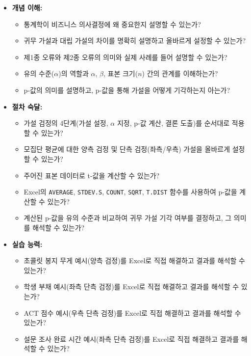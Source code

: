 \documentclass[11pt,a4paper]{article}
\theoremstyle{definition}
\begin{document}
\begin{itemize}
    \item \textbf{개념 이해:}
    \begin{itemize}
        \item 통계학이 비즈니스 의사결정에 왜 중요한지 설명할 수 있는가?
        \item 귀무 가설과 대립 가설의 차이를 명확히 설명하고 올바르게 설정할 수 있는가?
        \item 제1종 오류와 제2종 오류의 의미와 실제 사례를 들어 설명할 수 있는가?
        \item 유의 수준($\alpha$)의 역할과 $\alpha$, $\beta$, 표본 크기($n$) 간의 관계를 이해하는가?
        \item p-값의 의미를 설명하고, p-값을 통해 가설을 어떻게 기각하는지 아는가?
    \end{itemize}
    \item \textbf{절차 숙달:}
    \begin{itemize}
        \item 가설 검정의 4단계(가설 설정, $\alpha$ 지정, p-값 계산, 결론 도출)를 순서대로 적용할 수 있는가?
        \item 모집단 평균에 대한 양측 검정 및 단측 검정(좌측/우측) 가설을 올바르게 설정할 수 있는가?
        \item 주어진 표본 데이터로 t-값을 계산할 수 있는가?
        \item Excel의 \texttt{AVERAGE}, \texttt{STDEV.S}, \texttt{COUNT}, \texttt{SQRT}, \texttt{T.DIST} 함수를 사용하여 p-값을 계산할 수 있는가?
        \item 계산된 p-값을 유의 수준과 비교하여 귀무 가설 기각 여부를 결정하고, 그 의미를 해석할 수 있는가?
    \end{itemize}
    \item \textbf{실습 능력:}
    \begin{itemize}
        \item 초콜릿 봉지 무게 예시(양측 검정)를 Excel로 직접 해결하고 결과를 해석할 수 있는가?
        \item 학생 부채 예시(좌측 단측 검정)를 Excel로 직접 해결하고 결과를 해석할 수 있는가?
        \item ACT 점수 예시(우측 단측 검정)를 Excel로 직접 해결하고 결과를 해석할 수 있는가?
        \item 설문 조사 완료 시간 예시(좌측 단측 검정)를 Excel로 직접 해결하고 결과를 해석할 수 있는가?
    \end{itemize}
\end{itemize}
\end{document}
